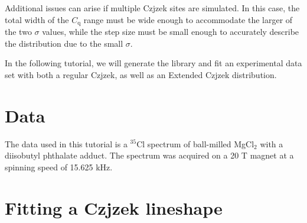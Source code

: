 \documentclass[11pt,a4paper]{article}
\begin{document}
Additional issues can arise if multiple Czjzek sites are simulated. In this case, the total width of the 
$C_\text{q}$ range must be wide enough to accommodate the larger of the two $\sigma$ values, while the step size must be small enough to accurately describe the distribution due to the small $\sigma$.

In the following tutorial, we will generate the library and fit an experimental data set with both a regular Czjzek, as well as an Extended Czjzek distribution.


\section{Data}
The data used in this tutorial is a $^{35}$Cl spectrum of ball-milled MgCl$_2$ with a diisobutyl phthalate adduct. The spectrum was acquired on a 20 T magnet at a spinning speed of 15.625 kHz.


\section{Fitting a Czjzek lineshape}

\end{document}
